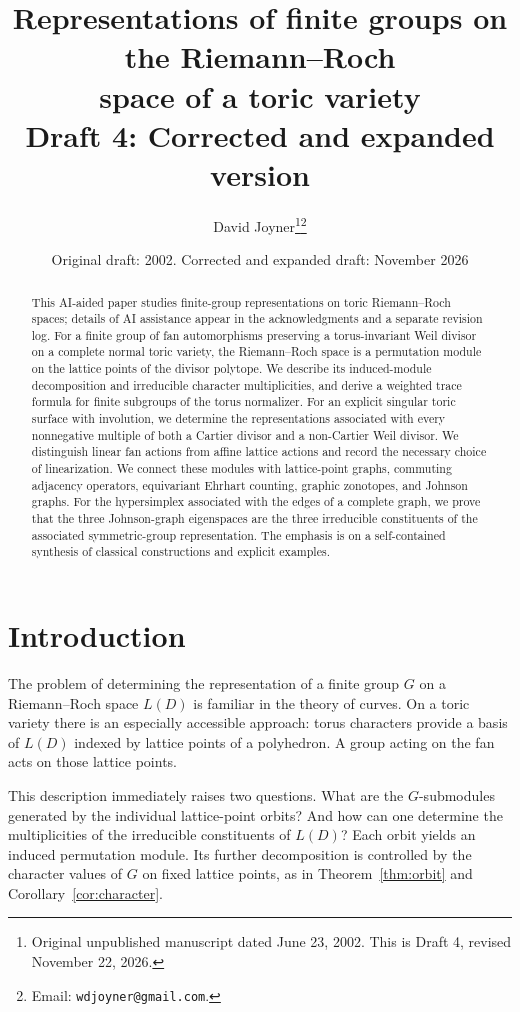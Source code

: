 \documentclass[12pt,letterpaper]{article}
\title{Representations of finite groups on the Riemann--Roch\\space of a toric variety\\[5pt]
\large Draft 4: Corrected and expanded version}
\author{David Joyner\thanks{Original unpublished manuscript dated June 23, 2002. This is Draft 4, revised November 22, 2026.}\thanks{Email: \texttt{wdjoyner@gmail.com}.}}
\date{Original draft: 2002. Corrected and expanded draft: November 2026}
\theoremstyle{definition}
\theoremstyle{remark}
\numberwithin{equation}{section}
\begin{document}
\maketitle
\begin{abstract}
This AI-aided paper studies finite-group representations on toric Riemann--Roch spaces; details of AI assistance appear in the acknowledgments and a separate revision log. For a finite group of fan automorphisms preserving a torus-invariant Weil divisor on a complete normal toric variety, the Riemann--Roch space is a permutation module on the lattice points of the divisor polytope. We describe its induced-module decomposition and irreducible character multiplicities, and derive a weighted trace formula for finite subgroups of the torus normalizer. For an explicit singular toric surface with involution, we determine the representations associated with every nonnegative multiple of both a Cartier divisor and a non-Cartier Weil divisor. We distinguish linear fan actions from affine lattice actions and record the necessary choice of linearization. We connect these modules with lattice-point graphs, commuting adjacency operators, equivariant Ehrhart counting, graphic zonotopes, and Johnson graphs. For the hypersimplex associated with the edges of a complete graph, we prove that the three Johnson-graph eigenspaces are the three irreducible constituents of the associated symmetric-group representation. The emphasis is on a self-contained synthesis of classical constructions and explicit examples.
\end{abstract}
\tableofcontents

\section{Introduction}
The problem of determining the representation of a finite group $G$ on a Riemann--Roch space $L(D)$ is familiar in the theory of curves. On a toric variety there is an especially accessible approach: torus characters provide a basis of $L(D)$ indexed by lattice points of a polyhedron. A group acting on the fan acts on those lattice points.

This description immediately raises two questions. What are the $G$-submodules generated by the individual lattice-point orbits? And how can one determine the multiplicities of the irreducible constituents of $L(D)$? Each orbit yields an induced permutation module. Its further decomposition is controlled by the character values of $G$ on fixed lattice points, as in Theorem~\ref{thm:orbit} and Corollary~\ref{cor:character}.
\end{document}
